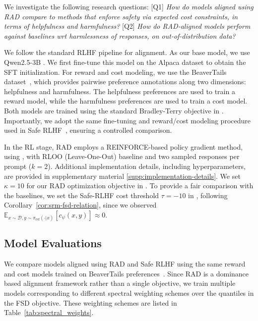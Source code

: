 We investigate the following research questions: [Q1] \emph{How do models aligned using RAD compare to methods that enforce safety via expected cost constraints, in terms of helpfulness and harmfulness?} [Q2] \emph{How do RAD-aligned models perform against baselines wrt harmlessness of responses, on out-of-distribution data?}

We follow the standard RLHF pipeline for alignment. As our base model, we use Qwen2.5-3B \citep{qwen2025qwen25technicalreport}. We first fine-tune this model on the Alpaca dataset \citep{alpaca}  to obtain the SFT initialization. For reward and cost modeling, we use the BeaverTails dataset~\citep{ji2023beavertailsimprovedsafetyalignment}, which provides pairwise preference annotations along two dimensions: helpfulness and harmfulness. The helpfulness preferences are used to train a reward model, while the harmfulness preferences are used to train a cost model. Both models are trained using the standard Bradley-Terry objective \citep{bradley1952rank} in . Importantly, we adopt the same fine-tuning and reward/cost modeling procedure used in Safe RLHF~\citep{dai2023safe}, ensuring a controlled comparison.

In the RL stage, RAD employs a REINFORCE-based policy gradient method, using , with RLOO (Leave-One-Out) baseline and two sampled responses per prompt ($k = 2$). Additional implementation
details, including hyperparameters, are provided in supplementary material \ref{supp:implementation-details}. We set $\kappa=10$ for our RAD optimization objective in 
. To provide a fair comparison with the baselines, we set the Safe-RLHF cost threshold $\tau=-10$ in , following Corollary~\ref{cor:srm-fsd-relation}, since we observed $\mathbb{E}_{x \sim \mathcal{D}, y \sim 
\pi_{\textrm{ref}}(\cdot\vert x)}[c_{\psi}(x,y)] \approx 0$.

\subsection{Model Evaluations}

We compare models aligned using RAD and Safe RLHF using the same reward and cost models trained on BeaverTails preferences~\citep{ji2023beavertailsimprovedsafetyalignment}. Since RAD is a dominance based alignment framework rather than a single objective, we train multiple models corresponding to different spectral weighting schemes over the quantiles in the FSD objective. These weighting schemes are listed in Table~\ref{tab:spectral_weights}.

